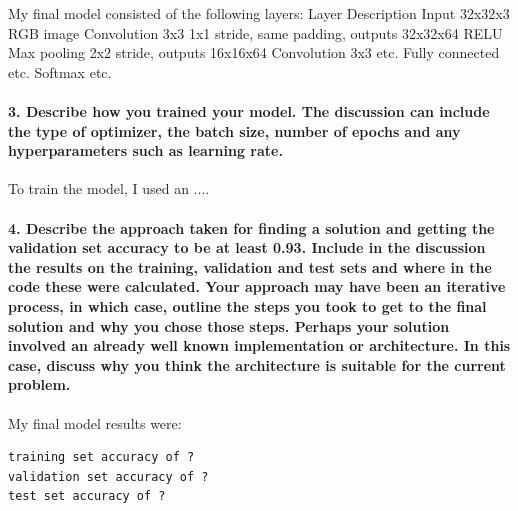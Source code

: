 \documentclass[11pt]{article}
\begin{document}
My final model consisted of the following layers: Layer Description
Input 32x32x3 RGB image Convolution 3x3 1x1 stride, same padding,
outputs 32x32x64 RELU\\
Max pooling 2x2 stride, outputs 16x16x64 Convolution 3x3 etc. Fully
connected etc. Softmax etc.

\paragraph{3. Describe how you trained your model. The discussion can
include the type of optimizer, the batch size, number of epochs and any
hyperparameters such as learning
rate.}\label{describe-how-you-trained-your-model.-the-discussion-can-include-the-type-of-optimizer-the-batch-size-number-of-epochs-and-any-hyperparameters-such-as-learning-rate.}

To train the model, I used an ....

\paragraph{4. Describe the approach taken for finding a solution and
getting the validation set accuracy to be at least 0.93. Include in the
discussion the results on the training, validation and test sets and
where in the code these were calculated. Your approach may have been an
iterative process, in which case, outline the steps you took to get to
the final solution and why you chose those steps. Perhaps your solution
involved an already well known implementation or architecture. In this
case, discuss why you think the architecture is suitable for the current
problem.}\label{describe-the-approach-taken-for-finding-a-solution-and-getting-the-validation-set-accuracy-to-be-at-least-0.93.-include-in-the-discussion-the-results-on-the-training-validation-and-test-sets-and-where-in-the-code-these-were-calculated.-your-approach-may-have-been-an-iterative-process-in-which-case-outline-the-steps-you-took-to-get-to-the-final-solution-and-why-you-chose-those-steps.-perhaps-your-solution-involved-an-already-well-known-implementation-or-architecture.-in-this-case-discuss-why-you-think-the-architecture-is-suitable-for-the-current-problem.}

My final model results were:

\begin{verbatim}
training set accuracy of ?
validation set accuracy of ?
test set accuracy of ?
\end{verbatim}
\end{document}
